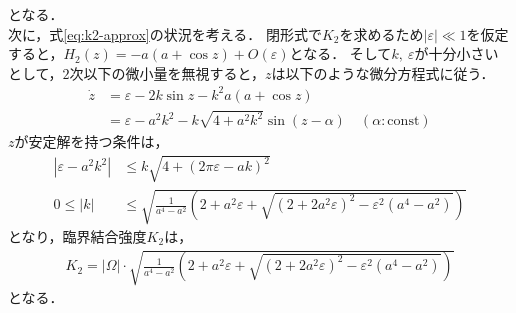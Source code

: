\documentclass[../main]{subfiles}
\begin{document}
    となる．\\
    次に，式\eqref{eq:k2-approx}の状況を考える．
    閉形式で$K_2$を求めるため$|\varepsilon| \ll 1$を仮定すると，$H_2(z)=-a(a+\cos z)+O(\varepsilon)$となる．
    そして$k,\ \varepsilon$が十分小さいとして，$2$次以下の微小量を無視すると，$z$は以下のような微分方程式に従う．
    \begin{align*}
        \dot{z}&=\varepsilon-2k\sin z-k^2a(a+\cos  z)\\
        &=\varepsilon-a^2k^2-k\sqrt{4+a^2k^2}\sin ( z-\alpha)\quad(\alpha:\mathrm{const})
    \end{align*}
    $z$が安定解を持つ条件は，
    \begin{align*}
        |\varepsilon-a^2k^2|&\leq k\sqrt{4+(2\pi\varepsilon-ak)^2}\\
        0\leq |k|&\leq \sqrt{\frac{1}{a^4-a^2}\left(2+a^2\varepsilon+\sqrt{(2+2a^2\varepsilon)^2-\varepsilon^2(a^4-a^2)}\right)}
    \end{align*}
    となり，臨界結合強度$K_2$は，
    \begin{align*}
        K_2=|\Omega|\cdot\sqrt{\frac{1}{a^4-a^2}\left(2+a^2\varepsilon+\sqrt{(2+2a^2\varepsilon)^2-\varepsilon^2(a^4-a^2)}\right)}
    \end{align*}
    となる．    
    
\end{document}
